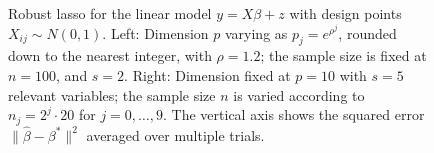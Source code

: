\begin{figure}[t]
\begin{center}
\begin{tabular}{cc}
    \end{tabular}
  \end{center}
\caption{Robust lasso for the linear model  $y=X\beta + z$ with design points $X_{ij}\sim N(0,1)$.
Left: Dimension $p$ varying as $p_{j} = e^{\rho^j}$, rounded down to the nearest integer, with $\rho=1.2$; the sample size is fixed at $n=100$, and $s=2$. Right: Dimension fixed at $p=10$ with $s=5$ relevant variables; the sample size $n$ is varied according to
$n_j = 2^j \cdot 20$ for $j=0,\ldots, 9$. The vertical axis shows the squared error $\|\hat \beta - \beta^*\|^2$ averaged over multiple trials.}
\end{figure}

